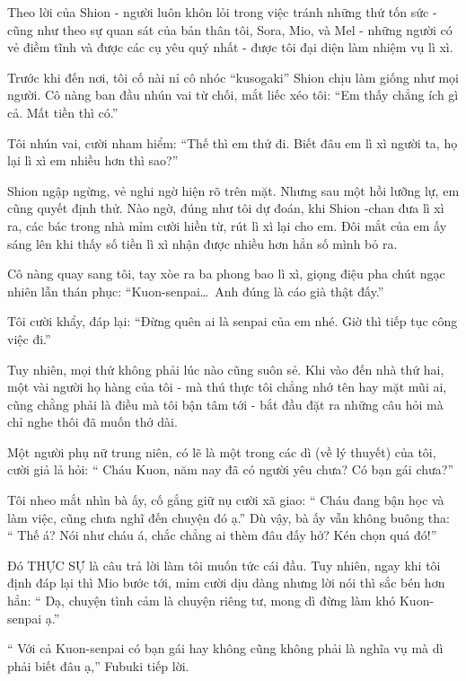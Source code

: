 \documentclass[../main.tex]{subfiles}
\begin{document}
Theo lời của Shion - người luôn khôn lỏi trong việc tránh những thứ tốn sức - cũng như theo sự quan sát của bản thân tôi, Sora, Mio, và Mel - những người có vẻ điềm tĩnh và được các cụ yêu quý nhất - được tôi đại diện làm nhiệm vụ lì xì.

Trước khi đến nơi, tôi cố nài nỉ cô nhóc ``kusogaki'' Shion chịu làm giống như mọi người. Cô nàng ban đầu nhún vai từ chối, mắt liếc xéo tôi: ``Em thấy chẳng ích gì cả. Mất tiền thì có.''

Tôi nhún vai, cười nham hiểm: ``Thế thì em thử đi. Biết đâu em lì xì người ta, họ lại lì xì em nhiều hơn thì sao?''

Shion ngập ngừng, vẻ nghi ngờ hiện rõ trên mặt. Nhưng sau một hồi lưỡng lự, em cũng quyết định thử. Nào ngờ, đúng như tôi dự đoán, khi Shion -chan đưa lì xì ra, các bác trong nhà mỉm cười hiền từ, rút lì xì lại cho em. Đôi mắt của em ấy sáng lên khi thấy số tiền lì xì nhận được nhiều hơn hẳn số mình bỏ ra.

Cô nàng quay sang tôi, tay xòe ra ba phong bao lì xì, giọng điệu pha chút ngạc nhiên lẫn thán phục: ``Kuon-senpai\dots\ Anh đúng là cáo già thật đấy.''

Tôi cười khẩy, đáp lại: ``Đừng quên ai là senpai của em nhé. Giờ thì tiếp tục công việc đi.''

Tuy nhiên, mọi thứ không phải lúc nào cũng suôn sẻ. Khi vào đến nhà thứ hai, một vài người họ hàng của tôi - mà thú thực tôi chẳng nhớ tên hay mặt mũi ai, cũng chằng phải là điều mà tôi bận tâm tới - bắt đầu đặt ra những câu hỏi mà chỉ nghe thôi đã muốn thở dài.

\il

Một người phụ nữ trung niên, có lẽ là một trong các dì (về lý thuyết) của tôi, cười giả lả hỏi: ``{\color{red} Cháu Kuon, năm nay đã có người yêu chưa? Có bạn gái chưa?}''

Tôi nheo mắt nhìn bà ấy, cố gắng giữ nụ cười xã giao: ``{\color{red} Cháu đang bận học và làm việc, cũng chưa nghĩ đến chuyện đó ạ.}'' Dù vậy, bà ấy vẫn không buông tha: ``{\color{red} Thế á? Nói như cháu á, chắc chẳng ai thèm đâu đấy hở? Kén chọn quá đó!}''

Đó THỰC SỰ là câu trả lời làm tôi muốn tức cái đầu. Tuy nhiên, ngay khi tôi định đáp lại thì Mio bước tới, mỉm cười dịu dàng nhưng lời nói thì sắc bén hơn hẳn: ``{\color{red} Dạ, chuyện tình cảm là chuyện riêng tư, mong dì đừng làm khó Kuon-senpai ạ.}''

``{\color{red} Với cả Kuon-senpai có bạn gái hay không cũng không phải là nghĩa vụ mà dì phải biết đâu ạ,}'' Fubuki tiếp lời.
\end{document}
